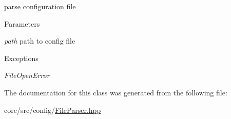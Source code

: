 parse configuration file 


\begin{DoxyParams}{Parameters}
\item[{\em path}]path to config file \end{DoxyParams}

\begin{DoxyExceptions}{Exceptions}
\item[{\em FileOpenError}]\end{DoxyExceptions}


The documentation for this class was generated from the following file:\begin{DoxyCompactItemize}
\item 
core/src/config/\hyperlink{FileParser_8hpp}{FileParser.hpp}\end{DoxyCompactItemize}
